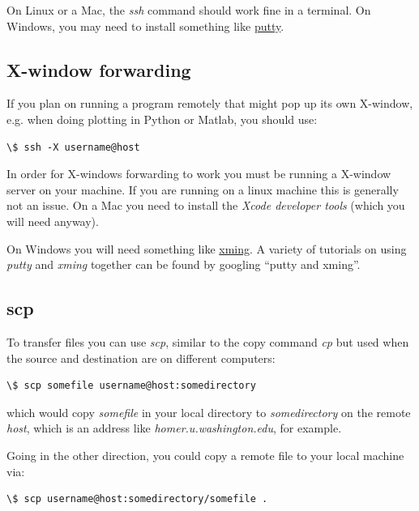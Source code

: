 \documentclass[letterpaper,10pt,english]{sphinxmanual}
\begin{document}
On Linux or a
Mac, the \emph{ssh} command should work fine in a terminal.  On Windows, you may
need to install something like \href{http://www.putty.org/}{putty}.


\subsection{X-window forwarding}
\label{ssh:ssh-x}\label{ssh:x-window-forwarding}
If you plan on running a program remotely that might pop up its own
X-window, e.g. when doing plotting in Python or Matlab, you should use:

\begin{Verbatim}[commandchars=\\\{\}]
\$ ssh -X username@host
\end{Verbatim}

In order for X-windows forwarding to work you must be running
a X-window server on your machine.  If you are running on a linux machine
this is generally not an issue.  On a Mac you need to install the \emph{Xcode
developer tools} (which you will need anyway).

On Windows you will need something like \href{http://sourceforge.net/projects/xming/}{xming}.  A variety of tutorials on
using \emph{putty} and \emph{xming} together can be found by googling ``putty and
xming''.


\subsection{scp}
\label{ssh:scp}
To transfer files you can use \emph{scp}, similar to the copy command \emph{cp} but used
when the source and destination are on different computers:

\begin{Verbatim}[commandchars=\\\{\}]
\$ scp somefile username@host:somedirectory
\end{Verbatim}

which would copy \emph{somefile} in your local directory to \emph{somedirectory}
on the remote \emph{host}, which is an address like \emph{homer.u.washington.edu},
for example.

Going  in the other direction, you could copy a remote file to your local
machine via:

\begin{Verbatim}[commandchars=\\\{\}]
\$ scp username@host:somedirectory/somefile .
\end{Verbatim}
\end{document}
